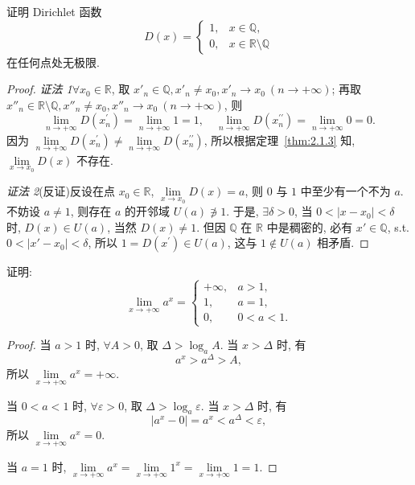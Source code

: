 \begin{example}\label{ex:2.1.15}
证明 Dirichlet 函数
\[
D(x)=\begin{cases}
1, & x\in\mathbb{Q}, \\
0, & x\in\mathbb{R}\setminus\mathbb{Q}
\end{cases}
\]
在任何点处无极限.
\end{example}

\begin{proof}
\textit{证法 1}\quad $\forall x_0 \in \mathbb{R}$, 取 $x'_n \in \mathbb{Q}, x'_n \neq x_0, x'_n \to x_0\ (n \to +\infty)$; 再取 $x''_n \in \mathbb{R} \setminus \mathbb{Q}, x''_n \neq x_0, x''_n \to x_0\ (n \to +\infty)$, 则
\[
\lim_{n\to+\infty}D(x_{n}^{\prime})=\lim_{n\to+\infty}1=1,\quad \lim_{n\to+\infty}D(x_{n}^{\prime \prime})=\lim_{n\to+\infty}0=0.
\]
因为 $\lim\limits_{n\to+\infty}D(x_{n}^{\prime})\neq\lim\limits_{n\to+\infty}D(x_{n}^{\prime\prime})$, 所以根据定理~\ref{thm:2.1.3} 知, $\lim\limits_{x\to x_{0}}D(x)$ 不存在.

\textit{证法 2}\quad (反证)反设在点 $x_{0} \in \mathbb{R}$, $\lim\limits_{x \to x_{0}} D(x) = a$, 则 $0$ 与 $1$ 中至少有一个不为 $a$. 不妨设 $a \neq 1$, 则存在 $a$ 的开邻域 $U(a) \not\ni 1$. 于是, $\exists \delta > 0$, 当 $0 < |x - x_{0}| < \delta$ 时, $D(x) \in U(a)$, 当然 $D(x) \neq 1$. 但因 $\mathbb{Q}$ 在 $\mathbb{R}$ 中是稠密的, 必有 $x' \in \mathbb{Q}$, s.t. $0 < |x' - x_{0}| < \delta$, 所以 $1=D(x^{\prime})\in U(a)$, 这与 $1 \notin U(a)$ 相矛盾.
\end{proof}

\begin{example}\label{ex:2.1.16}
证明:
\[
\lim_{x\to+\infty}a^x=\begin{cases}
+\infty, & a>1, \\
1, & a=1, \\
0, & 0<a<1.
\end{cases}
\]
\end{example}

\begin{proof}
当 $a>1$ 时, $\forall A>0$, 取 $\Delta>\log_{a}A$. 当 $x>\Delta$ 时, 有
\[
a^{x}>a^{\Delta}>A,
\]
所以 $\lim\limits_{x\to+\infty}a^{x}=+\infty$.

当 $0 < a < 1$ 时, $\forall \varepsilon > 0$, 取 $\Delta > \log_{a}\varepsilon$. 当 $x > \Delta$ 时, 有
\[
|a^{x}-0|=a^{x}<a^{\Delta}<\varepsilon,
\]
所以 $\lim\limits_{x\to+\infty}a^{x}=0$.

当 $a=1$ 时, $\lim\limits_{x\to+\infty}a^{x}=\lim\limits_{x\to+\infty}1^{x}=\lim\limits_{x\to+\infty}1=1$.
\end{proof}

